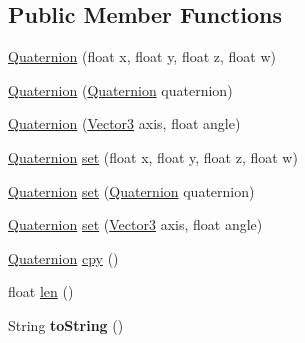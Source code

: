 \subsection*{Public Member Functions}
\begin{DoxyCompactItemize}
\item 
\hyperlink{classairhockeyjava_1_1util_1_1_quaternion_acd38f3a6a79288b27bbdd656b6b328ae}{Quaternion} (float x, float y, float z, float w)
\item 
\hyperlink{classairhockeyjava_1_1util_1_1_quaternion_ad47bbcf5cfcf85a2f827ff5536e1ba20}{Quaternion} (\hyperlink{classairhockeyjava_1_1util_1_1_quaternion}{Quaternion} quaternion)
\item 
\hyperlink{classairhockeyjava_1_1util_1_1_quaternion_aef51bb0af0ecaaad45aa4cd524134d11}{Quaternion} (\hyperlink{classairhockeyjava_1_1util_1_1_vector3}{Vector3} axis, float angle)
\item 
\hyperlink{classairhockeyjava_1_1util_1_1_quaternion}{Quaternion} \hyperlink{classairhockeyjava_1_1util_1_1_quaternion_a17f61fefd7d177ea9cbc3a39cd2f373d}{set} (float x, float y, float z, float w)
\item 
\hyperlink{classairhockeyjava_1_1util_1_1_quaternion}{Quaternion} \hyperlink{classairhockeyjava_1_1util_1_1_quaternion_aca0f203fd73694fad81b5cc7771c226d}{set} (\hyperlink{classairhockeyjava_1_1util_1_1_quaternion}{Quaternion} quaternion)
\item 
\hyperlink{classairhockeyjava_1_1util_1_1_quaternion}{Quaternion} \hyperlink{classairhockeyjava_1_1util_1_1_quaternion_a600177cd04c669997ac9ec09253a4fad}{set} (\hyperlink{classairhockeyjava_1_1util_1_1_vector3}{Vector3} axis, float angle)
\item 
\hyperlink{classairhockeyjava_1_1util_1_1_quaternion}{Quaternion} \hyperlink{classairhockeyjava_1_1util_1_1_quaternion_ac129b4ee0bb16dbf6d3a2bcc17ee30d7}{cpy} ()
\item 
float \hyperlink{classairhockeyjava_1_1util_1_1_quaternion_ac2dde3aeb4995022c637c64488afcb33}{len} ()
\item 
\hypertarget{classairhockeyjava_1_1util_1_1_quaternion_ab02a9bf0f9eef4fc8c41a6f073a54842}{}String {\bfseries to\+String} ()\label{classairhockeyjava_1_1util_1_1_quaternion_ab02a9bf0f9eef4fc8c41a6f073a54842}


\end{DoxyCompactItemize}

